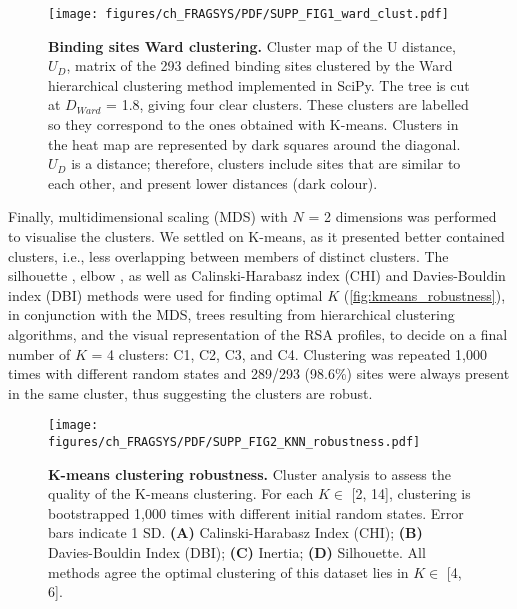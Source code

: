 \begin{figure}[ht!]
    \centering
    \texttt{[image: figures/ch\_FRAGSYS/PDF/SUPP\_FIG1\_ward\_clust.pdf]}
    \caption[Binding sites Ward clustering]{\textbf{Binding sites Ward clustering.} Cluster map of the U distance, $U_{D}$, matrix of the 293 defined binding sites clustered by the Ward hierarchical clustering method implemented in SciPy. The tree is cut at $D_{Ward}$ = 1.8, giving four clear clusters. These clusters are labelled so they correspond to the ones obtained with K-means. Clusters in the heat map are represented by dark squares around the diagonal. $U_{D}$ is a distance; therefore, clusters include sites that are similar to each other, and present lower distances (dark colour).}
    \label{fig:fragsys_bs_clust_ward}
\end{figure}

Finally, multidimensional scaling (MDS) \cite{MEAD_1992_MDS} with $N$ = 2 dimensions was performed to visualise the clusters. We settled on K-means, as it presented better contained clusters, i.e., less overlapping between members of distinct clusters. The silhouette \cite{ROUSSEEUW_1987_SILHOUETTES}, elbow \cite{THORNDIKE_1953_ELBOW}, as well as Calinski-Harabasz index (CHI) \cite{CALINSKI_1974_CHI} and Davies-Bouldin index (DBI) \cite{DAVIES_1979_DBI} methods were used for finding optimal $K$ (\autoref{fig:kmeans_robustness}), in conjunction with the MDS, trees resulting from hierarchical clustering algorithms, and the visual representation of the RSA profiles, to decide on a final number of $K$ = 4 clusters: C1, C2, C3, and C4. Clustering was repeated 1,000 times with different random states and 289/293 (98.6\%) sites were always present in the same cluster, thus suggesting the clusters are robust.

\begin{figure}[ht!]
    \centering
    \texttt{[image: figures/ch\_FRAGSYS/PDF/SUPP\_FIG2\_KNN\_robustness.pdf]}
    \caption[K-means clustering robustness]{\textbf{K-means clustering robustness.} Cluster analysis to assess the quality of the K-means clustering. For each $K \in$ [2, 14], clustering is bootstrapped 1,000 times with different initial random states. Error bars indicate 1 SD. \textbf{(A)} Calinski-Harabasz Index (CHI); \textbf{(B)} Davies-Bouldin Index (DBI); \textbf{(C)} Inertia; \textbf{(D)} Silhouette. All methods agree the optimal clustering of this dataset lies in $K \in$ [4, 6].}
    \label{fig:kmeans_robustness}
\end{figure}

